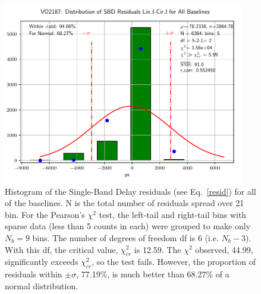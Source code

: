 \documentclass[letterpaper,twoside,12pt]{article}
\begin{document}
\begin{figure}[ht!]
  \begin{center}
  \includegraphics[width=25pc]{VO2187_Distr_SBD_Lin_I-Cir_I_Diff.pdf}
  \caption{\small Histogram of the Single-Band Delay residuals (see Eq.~\eqref{resid}) for all of the baselines. N is the total number of residuals spread over 21 bin. For the Pearson's $\chi^2$ test, the left-tail and right-tail bins with sparse data (less than 5 counts in each) were grouped to make only $N_b=9$ bins. The number of degrees of freedom df is 6 (i.e. $N_b-3$). With this df, the critical value, $\chi^2_{cr}$ is 12.59. The $\chi^2$ observed, 44.99, significantly exceeds $\chi^2_{cr}$, so the test fails. However, the proportion of residuals within $\pm\sigma$, 77.19\%, is much better than 68.27\% of a normal distribution.}
  \label{dsbd_distr}
  \end{center}
\end{figure}
\end{document}
